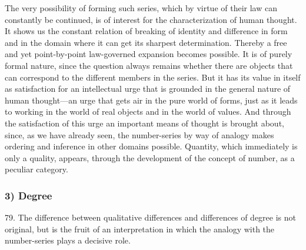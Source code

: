 \documentclass[12pt,a4paper]{book}
\begin{document}
The very possibility of forming such series, which by virtue of their law can
constantly be continued, is of interest for the characterization of human
thought. It shows us the constant relation of breaking of identity and
difference in form and in the domain where it can get its sharpest
determination. Thereby a free and yet point-by-point law-governed expansion
becomes possible. It is of purely formal nature, since the question always
remains whether there are objects that can correspond to the different
members in the series. But it has its value in itself as satisfaction for an
intellectual urge that is grounded in the general nature of human thought---an
urge that gets air in the pure world of forms, just as it leads to working in
the world of real objects and in the world of values. And through the
satisfaction of this urge an important means of thought is brought about,
since, as we have already seen, the number-series by way of analogy makes
ordering and inference in other domains possible. Quantity, which immediately
is only a quality, appears, through the development of the concept of number,
as a peculiar category.

\subsubsection*{3) Degree}

79. The difference between qualitative differences and differences of
degree is not original, but is the fruit of an interpretation in which the
analogy with the number-series plays a decisive role.
\end{document}
